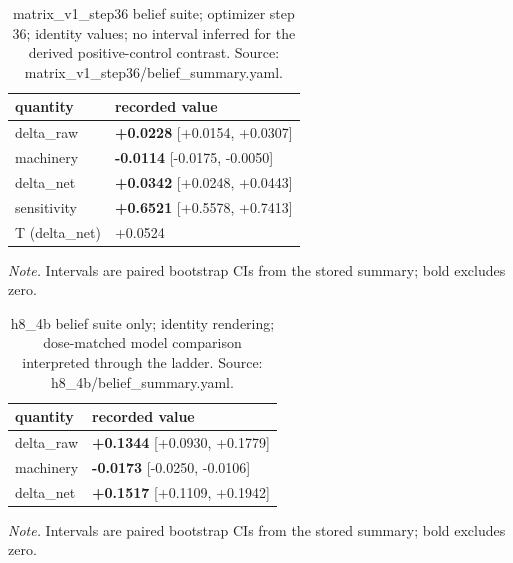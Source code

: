 \documentclass[10pt]{article}
\begin{document}
\begin{table}[H]
\centering
\footnotesize
\caption{ matrix\_v1\_step36 belief suite; optimizer step 36; identity values; no interval inferred for the derived positive-control contrast. Source: matrix\_v1\_step36/belief\_summary.yaml. }
\label{tab:belief_transfer}



\begin{tabular}{ ll }
\toprule
quantity & recorded value \\
\midrule

delta\_raw & \textbf{+0.0228} [+0.0154, +0.0307] \\

machinery & \textbf{-0.0114} [-0.0175, -0.0050] \\

delta\_net & \textbf{+0.0342} [+0.0248, +0.0443] \\

sensitivity & \textbf{+0.6521} [+0.5578, +0.7413] \\

T (delta\_net) & +0.0524 \\

\bottomrule
\end{tabular}

\par\footnotesize\emph{Note.} Intervals are paired bootstrap CIs from the stored summary; bold excludes zero.
\end{table}


\begin{table}[H]
\centering
\footnotesize
\caption{ h8\_4b belief suite only; identity rendering; dose-matched model comparison interpreted through the ladder. Source: h8\_4b/belief\_summary.yaml. }
\label{tab:belief_transfer}



\begin{tabular}{ ll }
\toprule
quantity & recorded value \\
\midrule

delta\_raw & \textbf{+0.1344} [+0.0930, +0.1779] \\

machinery & \textbf{-0.0173} [-0.0250, -0.0106] \\

delta\_net & \textbf{+0.1517} [+0.1109, +0.1942] \\

\bottomrule
\end{tabular}

\par\footnotesize\emph{Note.} Intervals are paired bootstrap CIs from the stored summary; bold excludes zero.
\end{table}
\end{document}
